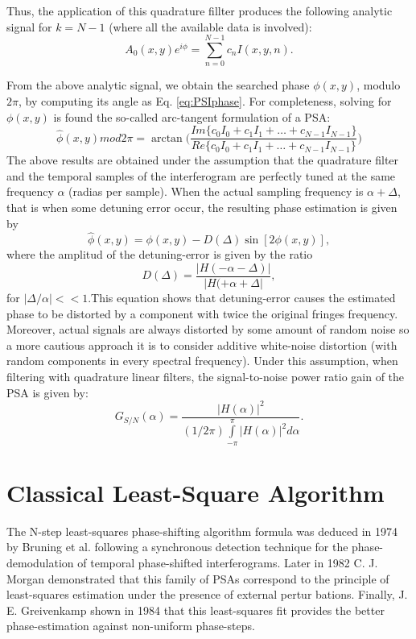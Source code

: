Thus, the application of this quadrature fillter produces the following analytic
signal for $k = N-1$ (where all the available data is involved):
\begin{equation}
 A_0(x,y)e^{i\phi}=\sum^{N-1}_{n=0} c_n I(x,y,n).
\end{equation}

From the above analytic signal, we obtain the searched phase $\phi(x,y)$, modulo
$2\pi$, by computing its angle as Eq. \eqref{eq:PSIphase}. For completeness, 
solving for $\phi(x,y)$ is found the so-called arc-tangent formulation of a PSA:
\begin{equation}
 \hat{\phi}(x,y) mod 2\pi= \arctan \Bigg(\frac{Im\{c_0I_0+c_1I_1 + \dots + c_{N-1}
I_{N-1}\}}{Re\{c_0I_0+c_1I_1 + \dots + c_{N-1} I_{N-1}\}}  \Bigg)
\end{equation}
The above results are obtained under the assumption that the quadrature filter
and the temporal samples of the interferogram are perfectly tuned at the same
frequency $\alpha$ (radias per sample). When the actual sampling frequency is
$\alpha+\Delta$, that is when some detuning error occur, the resulting phase 
estimation is given by
\begin{equation}
 \hat{\phi}(x,y)=\phi(x,y)-D(\Delta)\sin[2\phi(x,y)],
\end{equation}
where the amplitud of the detuning-error is given by the ratio
\begin{equation}
 D(\Delta)=\frac{|H(-\alpha-\Delta)|}{|H(+\alpha+\Delta|},
\end{equation}
for $|\Delta/\alpha|<<1$.This equation shows that detuning-error causes the 
estimated phase to be distorted by a component with twice the original fringes 
frequency. Moreover, actual signals are always distorted by some amount of random
noise so a more cautious approach it is to consider additive white-noise 
distortion (with random components in every spectral frequency). Under this 
assumption, when filtering with quadrature linear filters, the signal-to-noise 
power ratio gain of the PSA is given by:
\begin{equation}
 G_{S/N}(\alpha)=\frac{|H(\alpha)|^2}{(1/2\pi)\int\limits_{-\pi}^{\pi}
|H(\alpha)|^2 d\alpha}.
\end{equation}

\section{Classical Least-Square Algorithm}

The N-step least-squares phase-shifting algorithm formula was deduced in
1974 by Bruning et al. \cite{Bruning:74} following a synchronous detection 
technique for the phase-demodulation of temporal phase-shifted interferograms. 
Later in 1982 C. J. Morgan \cite{Morgan} demonstrated that this family of PSAs 
correspond to the principle of least-squares estimation under the presence of 
external pertur bations. Finally, J. E. Greivenkamp \cite{Greivenkamp} shown in 
1984 that this least-squares fit provides the better phase-estimation against 
non-uniform phase-steps.

